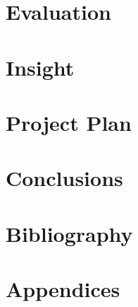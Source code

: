 \documentclass[11pt]{article}
\begin{document}
\section{Evaluation}

\section{Insight}

\section{Project Plan}

\section{Conclusions}

\section{Bibliography}

\section{Appendices}
\end{document}
